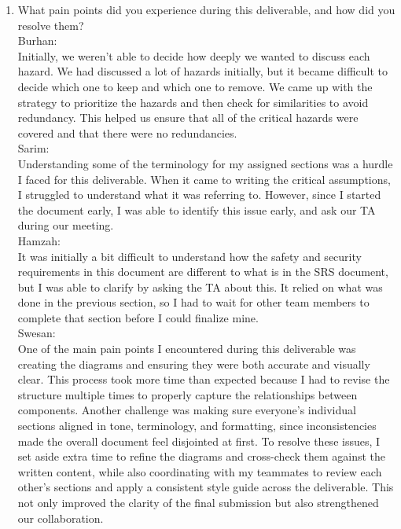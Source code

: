 \documentclass{article}
\begin{document}
\begin{enumerate}
    \item What pain points did you experience during this deliverable, and how
    did you resolve them?\\

    Burhan: \\
    Initially, we weren't able to decide how deeply we wanted to discuss each hazard. We had discussed a lot of hazards initially, but it became difficult to decide which one to keep and which one to remove. We came up with the strategy to prioritize the hazards and then check for similarities to avoid redundancy. This helped us ensure that all of the critical hazards were covered and that there were no redundancies.  \\    

    Sarim: \\
Understanding some of the terminology for my assigned sections was a hurdle I faced for this deliverable. When it came to writing the critical assumptions, I struggled to understand what it was referring to. However, since I started the document early, I was able to identify this issue early, and ask our TA during our meeting.
\\    

Hamzah: \\
It was initially a bit difficult to understand how the safety and security requirements in this document are different to what is in the SRS document, but I was able to clarify by asking the TA about this. It relied on what was done in the previous section, so I had to wait for other team members to complete that section before I could finalize mine. 
\\   

Swesan: \\
One of the main pain points I encountered during this deliverable was creating the diagrams and ensuring they were both accurate and visually clear. This process took more time than expected because I had to revise the structure multiple times to properly capture the relationships between components. Another challenge was making sure everyone's individual sections aligned in tone, terminology, and formatting, since inconsistencies made the overall document feel disjointed at first. To resolve these issues, I set aside extra time to refine the diagrams and cross-check them against the written content, while also coordinating with my teammates to review each other's sections and apply a consistent style guide across the deliverable. This not only improved the clarity of the final submission but also strengthened our collaboration. 
\\



\end{enumerate}
\end{document}
